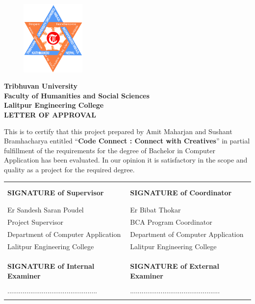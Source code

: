 \begin{figure}
    \centering
    \includegraphics[width=1.25in]{img/Graphics/TUlogo.png}
\end{figure}
\begin{center}
    {\fontsize{14pt}{18}\selectfont
    \textbf{Tribhuvan University\\
    Faculty of Humanities and Social Sciences\\
    Lalitpur Engineering College\\
    \vspace{0.2in}
    LETTER OF APPROVAL\\}
    \vspace{0.2in}}
\end{center}
This is to certify that this project prepared by Amit Maharjan and Sushant Bramhacharya entitled “\textbf{Code Connect :  Connect with Creatives}” in partial fulfillment of the requirements for the degree of Bachelor in Computer Application has been evaluated. In our opinion it is satisfactory in the
scope and quality as a project for the required degree.\\
\begin{center}
    {\fontsize{14pt}{18}\selectfont
    \begin{table}[ht]
        \begin{tabularx}{\textwidth}{|Y|Y|}
        \hline
        &\\
        &\\
        \textbf{SIGNATURE of Supervisor}&\textbf{SIGNATURE of Coordinator}\\
        &\\
        &\\
        Er Sandesh Saran Poudel & Er Bibat Thokar \\
        Project Supervisor & BCA Program Coordinator \\
        Department of Computer Application & Department of Computer Application\\
        Lalitpur Engineering College & Lalitpur Engineering College \\
        &\\
        &\\
        \hline
        &\\
        \textbf{SIGNATURE of Internal Examiner}&\textbf{SIGNATURE of External Examiner}\\
        &\\
        ...............................................&...............................................\\
        &\\
        \hline
        \end{tabularx}
        \end{table}
    }
\end{center}